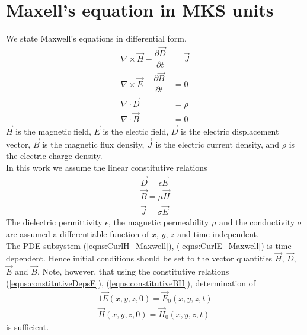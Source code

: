 \documentclass[12pt,twoside]{report}
\begin{document}
\section{Maxell's equation in MKS units}
We state Maxwell's equations in differential form.
\begin{subequations}

	\begin{align}
        \nabla \times \overrightarrow{H}-\dfrac{\partial \overrightarrow{D}}{\partial t} &= \overrightarrow{J}  \label{eqns:CurlH_Maxwell}	\\	
        \nabla \times \overrightarrow{E} + \dfrac{\partial \overrightarrow{B}}{\partial t}&= 0  \label{eqns:CurlE_Maxwell} \\
		\nabla \cdot \overrightarrow{D} &=  \rho	 \label{eqns:DivD_Maxwell}\\		
		\nabla \cdot \overrightarrow{B} &= 0	
	\end{align}
\end{subequations}
$\overrightarrow{H}$ is the magnetic field, $\overrightarrow{E}$ is the electic field, $\overrightarrow{D}$ is the electric displacement vector, $\overrightarrow{B}$ is the magnetic flux density, $\overrightarrow{J}$ is the electric current density, and $\rho$ is the electric charge density.\\
In this work we assume the linear constitutive relations 
\begin{subequations}
\begin{align}
        \overrightarrow{D} = \epsilon \overrightarrow{E} \label{eqns:constitutiveDepsE}\\
        \overrightarrow{B} = \mu \overrightarrow{H}	\label{eqns:constitutiveBH}\\
        \overrightarrow{J} = \sigma \overrightarrow{E}
\end{align}
\end{subequations}
The dielectric permittivity $\epsilon$, the magnetic permeability $\mu$ and the conductivity $\sigma$ are assumed a differentiable function of $x$, $y$, $z$ and time independent.\\
The PDE subsystem (\ref{eqns:CurlH_Maxwell}), (\ref{eqns:CurlE_Maxwell}) is time dependent. Hence initial conditions should be set to the vector quantities $\overrightarrow{H}$, $\overrightarrow{D}$, $\overrightarrow{E}$ and $\overrightarrow{B}$. Note, however, that using the constitutive relations (\ref{eqns:constitutiveDepsE}), (\ref{eqns:constitutiveBH}), determination of
\begin{subequations}
\begin{align}
\label{eqns:MaxwellSysInitCondE}1
\overrightarrow{E}(x,y,z,0) = \overrightarrow{E}_0(x,y,z,t)\\
\label{eqns:MaxwellSysInitCondH}
\overrightarrow{H}(x,y,z,0) = \overrightarrow{H}_0(x,y,z,t)
\end{align}
\end{subequations}
is sufficient.
\end{document}
